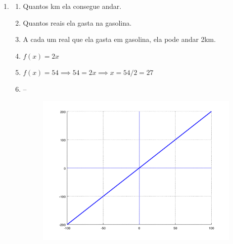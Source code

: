 \documentclass[12pt]{article}
\begin{document}
\begin{enumerate}
	\item 
	\begin{enumerate}
		\item Quantos km ela consegue andar.
		\item Quantos reais ela gasta na gasolina.
		\item A cada um real que ela gasta em gasolina, ela pode andar 2km.
		\item $f(x) = 2x$
		\item $f(x) = 54 \implies 54 = 2x \implies x = 54/2 = 27$
		\item --
			\begin{figure}[H]
				\centering
				\includegraphics[width=0.8\linewidth]{imgs/exc2chart2.png}
			\end{figure}
	\end{enumerate}
\end{enumerate}
\end{document}
